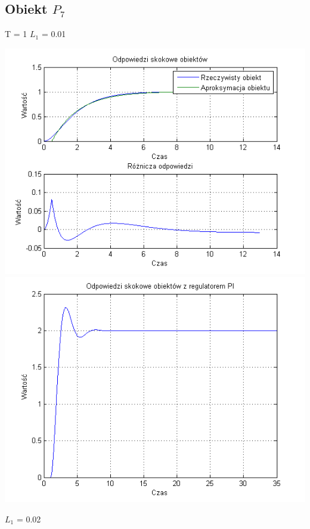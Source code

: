 \documentclass[10pt,a4paper]{article}
\begin{document}
\subsection{Obiekt $P_7$}
T = 1
$L_1$ = 0.01
\begin{center}
\includegraphics[scale=1]{images/jeden/skrypt_153.png}\\
\includegraphics[scale=1]{images/jeden/skrypt_154.png}\\
\end{center}
\newpage
$L_1$ = 0.02
\end{document}
